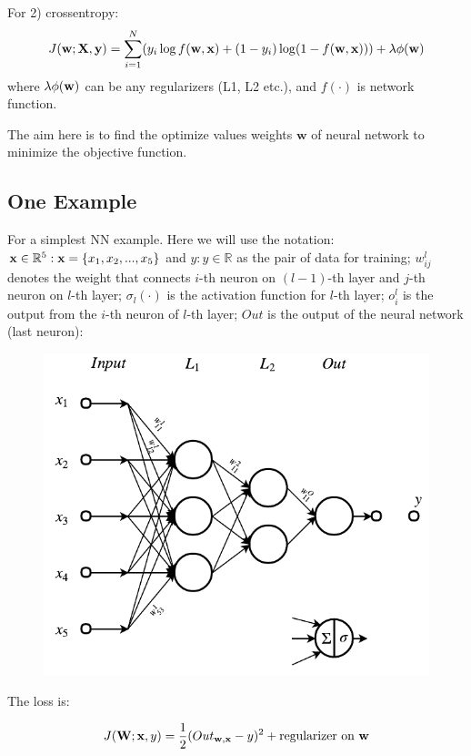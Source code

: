 \documentclass[11pt,a4paper]{article}
\begin{document}
For 2) crossentropy:
\begin{equation}
J(\mathbf{w}; \mathbf{X}, \mathbf{y}) = \sum^N_{i=1}(y_i\log f(\mathbf{w},\mathbf{x}) + (1-y_i)\log (1-f(\mathbf{w}, \mathbf{x}))) + \lambda \phi(\mathbf{w})
\end{equation}
where $\lambda \phi(\mathbf{w})$ can be any regularizers (L1, L2 etc.), and $f(\cdot)$ is network function. 

The aim here is to find the optimize values weights $\mathbf{w}$ of neural network to minimize the objective function. 

\subsection{One Example}
For a simplest NN example. Here we will use the notation: $\mathbf{x}\in \mathbb{R}^5: \mathbf{x} = \{x_1, x_2, ..., x_5\}$ and $y: y\in \mathbb{R}$ as the pair of data for training; $w^l_{ij}$ denotes the weight that connects $i$-th neuron on $(l-1)$-th layer and $j$-th neuron on $l$-th layer; $\sigma_l(\cdot)$ is the activation function for $l$-th layer; $o^l_i$ is the output from the $i$-th neuron of $l$-th layer; $Out$ is the output of the neural network (last neuron): 

\begin{figure}[h!]
	\includegraphics[scale=0.75]{figs/nn}
	\centering
\end{figure}

The loss is:

\begin{equation}
J(\mathbf{W}; \mathbf{x}, y) = \frac{1}{2} (Out_{\mathbf{w},\mathbf{x}} - y)^2 + \text{regularizer on } \mathbf{w}
\end{equation}
\end{document}
